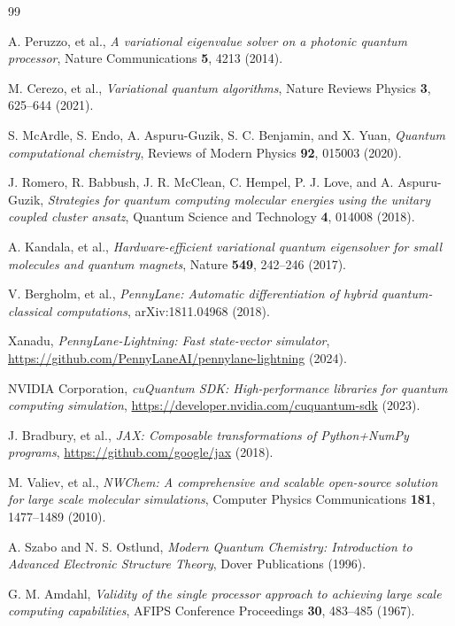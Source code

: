 \documentclass[11pt]{article}
\begin{document}
\begin{thebibliography}{99}

    A. Peruzzo, et al.,
    \textit{A variational eigenvalue solver on a photonic quantum processor},
    Nature Communications \textbf{5}, 4213 (2014).

    M. Cerezo, et al.,
    \textit{Variational quantum algorithms},
    Nature Reviews Physics \textbf{3}, 625--644 (2021).

    S. McArdle, S. Endo, A. Aspuru-Guzik, S. C. Benjamin, and X. Yuan,
    \textit{Quantum computational chemistry},
    Reviews of Modern Physics \textbf{92}, 015003 (2020).

    J. Romero, R. Babbush, J. R. McClean, C. Hempel, P. J. Love, and A. Aspuru-Guzik,
    \textit{Strategies for quantum computing molecular energies using the unitary coupled cluster ansatz},
    Quantum Science and Technology \textbf{4}, 014008 (2018).

    A. Kandala, et al.,
    \textit{Hardware-efficient variational quantum eigensolver for small molecules and quantum magnets},
    Nature \textbf{549}, 242--246 (2017).

    V. Bergholm, et al.,
    \textit{PennyLane: Automatic differentiation of hybrid quantum-classical computations},
    arXiv:1811.04968 (2018).

    Xanadu,
    \textit{PennyLane-Lightning: Fast state-vector simulator},
    \url{https://github.com/PennyLaneAI/pennylane-lightning} (2024).

    NVIDIA Corporation,
    \textit{cuQuantum SDK: High-performance libraries for quantum computing simulation},
    \url{https://developer.nvidia.com/cuquantum-sdk} (2023).

    J. Bradbury, et al.,
    \textit{JAX: Composable transformations of Python+NumPy programs},
    \url{https://github.com/google/jax} (2018).

    M. Valiev, et al.,
    \textit{NWChem: A comprehensive and scalable open-source solution for large scale molecular simulations},
    Computer Physics Communications \textbf{181}, 1477--1489 (2010).

    A. Szabo and N. S. Ostlund,
    \textit{Modern Quantum Chemistry: Introduction to Advanced Electronic Structure Theory},
    Dover Publications (1996).

    G. M. Amdahl,
    \textit{Validity of the single processor approach to achieving large scale computing capabilities},
    AFIPS Conference Proceedings \textbf{30}, 483--485 (1967).

\end{thebibliography}
\end{document}

